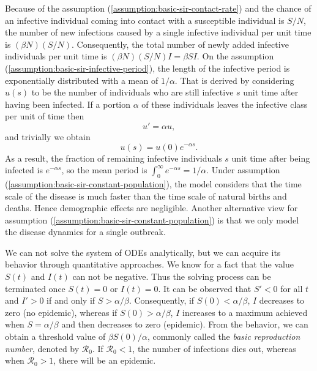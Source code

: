Because of the assumption (\ref{assumption:basic-sir-contact-rate}) and the chance of an infective individual coming into contact with a susceptible individual is $S / N$, the number of new infections caused by a single infective individual per unit time is $(\beta N) (S / N)$.
Consequently, the total number of newly added infective individuals per unit time is $(\beta N) (S / N) I = \beta S I$.
On the assumption (\ref{assumption:basic-sir-infective-period}), the length of the infective period is exponentially distributed with a mean of $1 / \alpha$.
That is derived by considering $u(s)$ to be the number of individuals who are still infective $s$ unit time after having been infected.
If a portion $\alpha$ of these individuals leaves the infective class per unit of time then
\begin{equation*}
    u' = \alpha u,
\end{equation*}
and trivially we obtain
\begin{equation*}
    u(s) = u(0) e ^ {- \alpha s}.
\end{equation*}
As a result, the fraction of remaining infective individuals $s$ unit time after being infected is $e ^ {- \alpha s}$, so the mean period is $\int_{0}^{\infty} e ^ {- \alpha s} = 1 / \alpha$.
Under assumption (\ref{assumption:basic-sir-constant-population}), the model considers that the time scale of the disease is much faster than the time scale of natural births and deaths.
Hence demographic effects are negligible.
Another alternative view for assumption (\ref{assumption:basic-sir-constant-population}) is that we only model the disease dynamics for a single outbreak.

We can not solve the system of \glspl{ODE} analytically, but we can acquire its behavior through quantitative approaches.
We know for a fact that the value $S(t)$ and $I(t)$ can not be negative.
Thus the solving process can be terminated once $S(t) = 0$ or $I(t) = 0$.
It can be observed that $S' < 0$ for all $t$ and $I' > 0$ if and only if $S > \alpha / \beta$.
Consequently, if $S(0) < \alpha / \beta$, $I$ decreases to zero (no epidemic), whereas if $S(0) > \alpha / \beta$, $I$ increases to a maximum achieved when $S = \alpha / \beta$ and then decreases to zero (epidemic).
From the behavior, we can obtain a threshold value of $\beta S(0) / \alpha$, commonly called the \textit{basic reproduction number}, denoted by $\mathcal{R}_0$.
If $\mathcal{R}_0 < 1$, the number of infections dies out, whereas when $\mathcal{R}_0 > 1$, there will be an epidemic.

